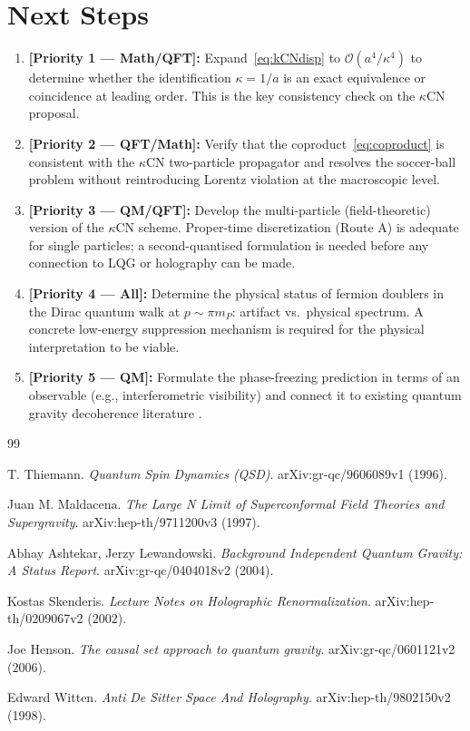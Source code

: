 \documentclass[11pt,a4paper]{article}
\begin{document}
\section{Next Steps}
\label{sec:nextsteps}

\begin{enumerate}
  \item \textbf{[Priority 1 --- Math/QFT]:} Expand~\eqref{eq:kCNdisp} to $\mathcal{O}(a^4/\kappa^4)$ to determine whether the identification $\kappa=1/a$ is an exact equivalence or coincidence at leading order. This is the key consistency check on the $\kappa$CN proposal.

  \item \textbf{[Priority 2 --- QFT/Math]:} Verify that the coproduct~\eqref{eq:coproduct} is consistent with the $\kappa$CN two-particle propagator and resolves the soccer-ball problem without reintroducing Lorentz violation at the macroscopic level.

  \item \textbf{[Priority 3 --- QM/QFT]:} Develop the multi-particle (field-theoretic) version of the $\kappa$CN scheme. Proper-time discretization (Route A) is adequate for single particles; a second-quantised formulation is needed before any connection to LQG \cite{thiemann1996} or holography \cite{maldacena1997,witten1998,skenderis2002} can be made.

  \item \textbf{[Priority 4 --- All]:} Determine the physical status of fermion doublers in the Dirac quantum walk at $p\sim\pi m_P$: artifact vs.\ physical spectrum. A concrete low-energy suppression mechanism is required for the physical interpretation to be viable.

  \item \textbf{[Priority 5 --- QM]:} Formulate the phase-freezing prediction in terms of an observable (e.g., interferometric visibility) and connect it to existing quantum gravity decoherence literature \cite{henson2006}.
\end{enumerate}

\begin{thebibliography}{99}

T. Thiemann.
\textit{Quantum Spin Dynamics (QSD)}.
arXiv:gr-qc/9606089v1 (1996).

Juan M. Maldacena.
\textit{The Large N Limit of Superconformal Field Theories and Supergravity}.
arXiv:hep-th/9711200v3 (1997).

Abhay Ashtekar, Jerzy Lewandowski.
\textit{Background Independent Quantum Gravity: A Status Report}.
arXiv:gr-qc/0404018v2 (2004).

Kostas Skenderis.
\textit{Lecture Notes on Holographic Renormalization}.
arXiv:hep-th/0209067v2 (2002).

Joe Henson.
\textit{The causal set approach to quantum gravity}.
arXiv:gr-qc/0601121v2 (2006).

Edward Witten.
\textit{Anti De Sitter Space And Holography}.
arXiv:hep-th/9802150v2 (1998).

\end{thebibliography}
\end{document}
